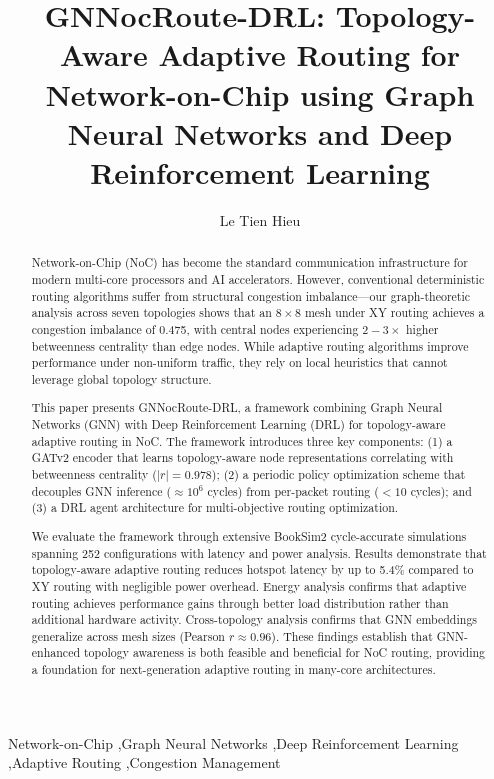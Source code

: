 \documentclass[5p,twocolumn]{elsarticle}
\begin{document}
\begin{frontmatter}

\title{GNNocRoute-DRL: Topology-Aware Adaptive Routing for Network-on-Chip using Graph Neural Networks and Deep Reinforcement Learning}

\author[1]{Le Tien Hieu}

\address[1]{Institute of Information Technology, Vietnam National University, Hanoi, Vietnam}

\begin{abstract}
Network-on-Chip (NoC) has become the standard communication infrastructure for modern multi-core processors and AI accelerators. However, conventional deterministic routing algorithms suffer from structural congestion imbalance---our graph-theoretic analysis across seven topologies shows that an $8\times8$ mesh under XY routing achieves a congestion imbalance of 0.475, with central nodes experiencing $2-3\times$ higher betweenness centrality than edge nodes. While adaptive routing algorithms improve performance under non-uniform traffic, they rely on local heuristics that cannot leverage global topology structure.

This paper presents GNNocRoute-DRL, a framework combining Graph Neural Networks (GNN) with Deep Reinforcement Learning (DRL) for topology-aware adaptive routing in NoC. The framework introduces three key components: (1) a GATv2 encoder that learns topology-aware node representations correlating with betweenness centrality ($|r| = 0.978$); (2) a periodic policy optimization scheme that decouples GNN inference ($\approx 10^6$ cycles) from per-packet routing ($<10$ cycles); and (3) a DRL agent architecture for multi-objective routing optimization.

We evaluate the framework through extensive BookSim2 cycle-accurate simulations spanning 252 configurations with latency and power analysis. Results demonstrate that topology-aware adaptive routing reduces hotspot latency by up to 5.4\% compared to XY routing with negligible power overhead. Energy analysis confirms that adaptive routing achieves performance gains through better load distribution rather than additional hardware activity. Cross-topology analysis confirms that GNN embeddings generalize across mesh sizes (Pearson $r \approx 0.96$). These findings establish that GNN-enhanced topology awareness is both feasible and beneficial for NoC routing, providing a foundation for next-generation adaptive routing in many-core architectures.
\end{abstract}

\begin{keyword}
Network-on-Chip \sep Graph Neural Networks \sep Deep Reinforcement Learning \sep Adaptive Routing \sep Congestion Management
\end{keyword}

\end{frontmatter}











\end{document}
